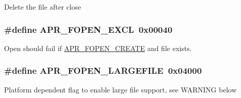 Delete the file after close \hypertarget{group__apr__file__open__flags_gabb7fb062cdf1d58faee8c7ea518496f1}{
\subsubsection[{A\-P\-R\-\_\-\-F\-O\-P\-E\-N\-\_\-\-E\-X\-C\-L}]{\setlength{\rightskip}{0pt plus 5cm}\#define A\-P\-R\-\_\-\-F\-O\-P\-E\-N\-\_\-\-E\-X\-C\-L~0x00040}}\label{group__apr__file__open__flags_gabb7fb062cdf1d58faee8c7ea518496f1}
Open should fail if \hyperlink{group__apr__file__open__flags_gafe94f21ccbf411172e70e7f473af251a}{A\-P\-R\-\_\-\-F\-O\-P\-E\-N\-\_\-\-C\-R\-E\-A\-T\-E} and file exists. \hypertarget{group__apr__file__open__flags_gaf6cfaa4789e6264afd186235f0adbc22}{
\subsubsection[{A\-P\-R\-\_\-\-F\-O\-P\-E\-N\-\_\-\-L\-A\-R\-G\-E\-F\-I\-L\-E}]{\setlength{\rightskip}{0pt plus 5cm}\#define A\-P\-R\-\_\-\-F\-O\-P\-E\-N\-\_\-\-L\-A\-R\-G\-E\-F\-I\-L\-E~0x04000}}\label{group__apr__file__open__flags_gaf6cfaa4789e6264afd186235f0adbc22}
Platform dependent flag to enable large file support, see W\-A\-R\-N\-I\-N\-G below

